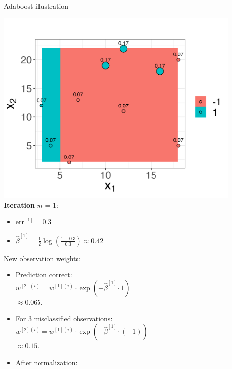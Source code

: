 \documentclass[11pt,compress,t,notes=noshow, xcolor=table]{beamer}
\begin{document}
\begin{vbframe}{Adaboost illustration}
\begin{footnotesize}
\begin{minipage}[b]{0.45\textwidth}
  \includegraphics[width=0.9\textwidth]{figure/adaboost_viz_mlr3_1.png}\\
  \textbf{Iteration} $m$ = 1:
  \begin{itemize}
    \item $\text{err}^{[1]} = 0.3$
    \item $\hat{\beta}^{[1]} = \frac{1}{2} \log \left( \frac{1 - 0.3}{0.3} 
    \right) \approx 0.42$
  \end{itemize}
\end{minipage}%
\begin{minipage}[b]{0.55\textwidth}
  New observation weights:
  \begin{itemize}
    \item Prediction correct: \\
      $w^{[2](i)} = w^{[1](i)} \cdot \exp \left(-\hat \beta^{[1]} \cdot 1 
      \right)$\\ $\approx 0.065.$
    \item For 3 misclassified observations: \\
      $w^{[2](i)} = w^{[1](i)} \cdot \exp \left(-\hat \beta^{[1]} \cdot (-1) 
      \right)$\\ $\approx 0.15.$
    \item After normalization: 
    \begin{itemize}
    \end{itemize}
\end{itemize}
\end{minipage}


\end{footnotesize}
\end{vbframe}
\end{document}
